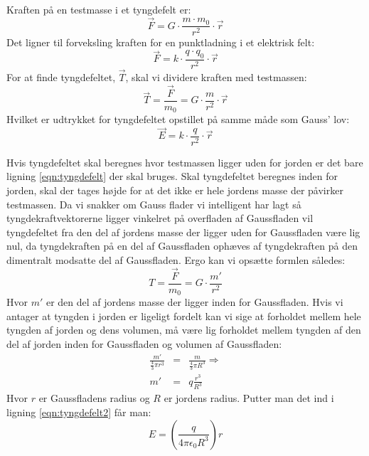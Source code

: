 Kraften på en testmasse i et tyngdefelt er:
\begin{equation}
	\vec{F} = G\cdot \frac{m \cdot m_0}{r^2} \cdot \vec{r}
\end{equation}
Det ligner til forveksling kraften for en punktladning i et elektrisk felt:
\begin{equation}
	\vec{F} = k \cdot \frac{q \cdot q_0}{r^2} \cdot \vec{r}
\end{equation}
For at finde tyngdefeltet, $\vec{T}$, skal vi dividere kraften med testmassen:
\begin{equation}
	\label{eqn:tyngdefelt}
	\vec{T} = \frac{\vec{F}}{m_0} = G \cdot \frac{m}{r^2} \cdot \vec{r}
\end{equation}
Hvilket er udtrykket for tyngdefeltet opstillet på samme måde som Gauss' lov:
\begin{equation}
	\vec{E} = k \cdot \frac{q}{r^2} \cdot \vec{r}
\end{equation}

Hvis tyngdefeltet skal beregnes hvor testmassen ligger uden for jorden er det bare ligning \ref{eqn:tyngdefelt} der skal bruges.
Skal tyngdefeltet beregnes inden for jorden, skal der tages højde for at det ikke er hele jordens masse der påvirker testmassen. Da vi snakker om Gauss flader vi intelligent har lagt så tyngdekraftvektorerne ligger vinkelret på overfladen af Gaussfladen vil tyngdefeltet fra den del af jordens masse der ligger uden for Gaussfladen være lig nul, da tyngdekraften på en del af Gaussfladen ophæves af tyngdekraften på den dimentralt modsatte del af Gaussfladen.
Ergo kan vi opsætte formlen således:
\begin{equation}
	\label{eqn:tyngdefelt2}
	T = \frac{\vec{F}}{m_0} = G \cdot \frac{m'}{r^2}
\end{equation}
Hvor $m'$ er den del af jordens masse der ligger inden for Gaussfladen. Hvis vi antager at tyngden i jorden er ligeligt fordelt kan vi sige at forholdet mellem hele tyngden af jorden og dens volumen, må være lig forholdet mellem tyngden af den del af jorden inden for Gaussfladen og volumen af Gaussfladen:
\begin{eqnarray}
	\frac{m'}{\frac{4}{3}\pi r^3} &=& \frac{m}{\frac{4}{3}\pi R^3} \Rightarrow \nonumber \\
	m' &=& q\frac{r^3}{R^3}
\end{eqnarray}
Hvor $r$ er Gaussfladens radius og $R$ er jordens radius. Putter man det ind i ligning \ref{eqn:tyngdefelt2} får man:
\begin{equation}
	E = (\frac{q}{4\pi \epsilon _0 R^3})r
\end{equation}